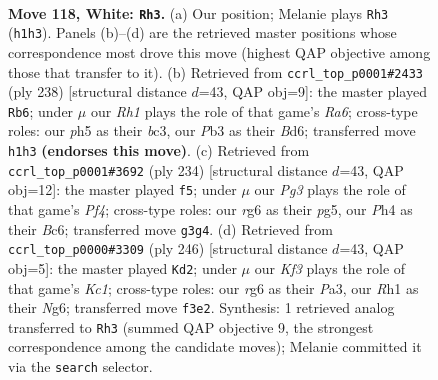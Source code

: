 \documentclass[11pt]{article}
\begin{document}
\begin{figure}[p]\centering
\begin{subfigure}{0.46\textwidth}\centering
\resizebox{\linewidth}{!}{%
\newchessgame
\chessboard[
  setfen={4k3/8/p5r1/P1p2p1p/1p3P1P/1P2PKP1/8/7R w - - 23 118},
  showmover=false,
  pgfstyle=straightmove, color=movearrow, markmove={h1-h3}
]}
\caption{}
\end{subfigure}\hfill
\begin{subfigure}{0.46\textwidth}\centering
\resizebox{\linewidth}{!}{%
\newchessgame
\chessboard[
  setfen={8/5k2/R2B2p1/3r1pPp/5P1P/2b2PK1/8/8 w - - 21 120},
  showmover=false,
  pgfstyle=straightmove, color=movearrow, markmove={a6-b6}
]}
\caption{}
\end{subfigure}
\\[4pt]
\begin{subfigure}{0.46\textwidth}\centering
\resizebox{\linewidth}{!}{%
\newchessgame
\chessboard[
  setfen={5k2/2n5/2Bp3p/p1p3p1/P1P2PP1/1P2R1K1/8/5r2 w - - 0 118},
  showmover=false,
  pgfstyle=straightmove, color=movearrow, markmove={f4-f5}
]}
\caption{}
\end{subfigure}\hfill
\begin{subfigure}{0.46\textwidth}\centering
\resizebox{\linewidth}{!}{%
\newchessgame
\chessboard[
  setfen={8/1b6/3k2N1/1p3p2/p1pP1Pp1/P1P3P1/1P6/2K5 w - - 29 124},
  showmover=false,
  pgfstyle=straightmove, color=movearrow, markmove={c1-d2}
]}
\caption{}
\end{subfigure}
\caption{\textbf{Move 118, White: \texttt{Rh3}.} (a) Our position; Melanie plays \texttt{Rh3} (\texttt{h1h3}). Panels (b)--(d) are the retrieved master positions whose correspondence most drove this move (highest QAP objective among those that transfer to it). (b) Retrieved from \texttt{ccrl\_top\_p0001\#2433} (ply 238) [structural distance $d$=43, QAP obj=9]: the master played \texttt{Rb6}; under $\mu$ our \emph{Rh1} plays the role of that game's \emph{Ra6}; cross-type roles: our \emph{p}h5 as their \emph{b}c3, our \emph{P}b3 as their \emph{B}d6; transferred move \texttt{h1h3} \textbf{(endorses this move)}. (c) Retrieved from \texttt{ccrl\_top\_p0001\#3692} (ply 234) [structural distance $d$=43, QAP obj=12]: the master played \texttt{f5}; under $\mu$ our \emph{Pg3} plays the role of that game's \emph{Pf4}; cross-type roles: our \emph{r}g6 as their \emph{p}g5, our \emph{P}h4 as their \emph{B}c6; transferred move \texttt{g3g4}. (d) Retrieved from \texttt{ccrl\_top\_p0000\#3309} (ply 246) [structural distance $d$=43, QAP obj=5]: the master played \texttt{Kd2}; under $\mu$ our \emph{Kf3} plays the role of that game's \emph{Kc1}; cross-type roles: our \emph{r}g6 as their \emph{P}a3, our \emph{R}h1 as their \emph{N}g6; transferred move \texttt{f3e2}. Synthesis: 1 retrieved analog transferred to \texttt{Rh3} (summed QAP objective 9, the strongest correspondence among the candidate moves); Melanie committed it via the \texttt{search} selector.}
\label{fig:thought-m234}
\end{figure}
\end{document}
